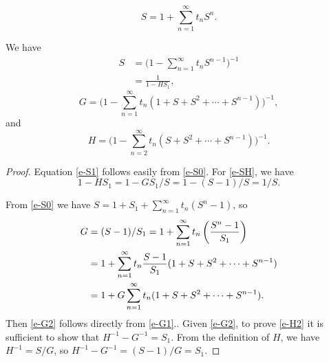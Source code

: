 \documentclass[10pt,a4paper]{amsart}
\begin{document}
\begin{equation}
\label{e-S0}
S=1+\sum_{n=1}^\infty t_n S^n. 
\end{equation}

\begin{thm}
\label{t-1}
We have
\begin{align}
S &= \biggl(1-\sum_{n=1}^{\infty} t_nS^{n-1}\biggr)^{-1}\label{e-S1}\\
  &= \frac{1}{1-H S_1}, \label{e-SH}
\end{align}
\begin{equation}
G=\biggl(1-\sum_{n=1}^\infty t_n (1+S+S^2+\cdots+S^{n-1})\biggr)^{-1},\label{e-G2}
\end{equation}
and 
\begin{equation}
\label{e-H2}
H=\biggl( 1-\sum_{n=2}^\infty t_n (S+S^2+\cdots+S^{n-1})\biggr)^{-1}.
\end{equation}
\end{thm}

\begin{proof}
Equation \eqref{e-S1} follows easily from \eqref{e-S0}. For \eqref{e-SH}, we have
\begin{equation*}
1-HS_1 = 1-G S_1/S = 1-(S-1)/S =1/S.
\end{equation*}




From \eqref{e-S0}
we have
$S =1+ S_1 + \sum_{n=1}^\infty t_n (S^n-1)$, so
\begin{align}
G&=(S-1)/S_1=
 1+\sum_{n=1}^\infty t_n \left(\frac{S^n-1}{S_1}\right)\notag\\
&=1+\sum_{n=1}^\infty t_n \frac{S-1}{S_1}(1+S+S^2+\cdots+S^{n-1})\notag\\
&= 1+G\sum_{n=1}^\infty t_n (1+S+S^2+\cdots+S^{n-1}).\label{e-G1}
\end{align}
Then \eqref{e-G2} follows directly from \eqref{e-G1}..
Given \eqref{e-G2}, to prove \eqref{e-H2} it is sufficient to show that 
$H^{-1}-G^{-1}=S_1$. From the definition of $H$,
 we have  $H^{-1}=S/G$, so $H^{-1}-G^{-1}=(S-1)/G = S_1$.
 \end{proof}
\end{document}
